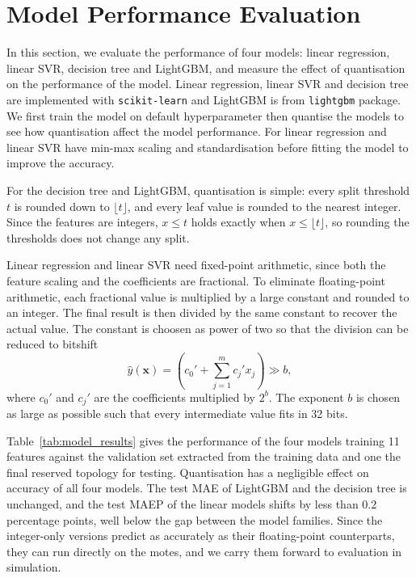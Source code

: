 \section{Model Performance Evaluation}
In this section, we evaluate the performance of four models: linear
regression, linear SVR, decision tree and
LightGBM, and measure the effect of quantisation on the performance of the
model. Linear regression, linear SVR and decision tree are
implemented with \texttt{scikit-learn} \cite{scikit-learn} and
LightGBM is from \texttt{lightgbm} package.
We first train the model on default hyperparameter then quantise the
models to see how quantisation affect the model performance. For
linear regression and linear SVR have min-max scaling and
standardisation before fitting the model to improve the accuracy.

For the decision tree and LightGBM, quantisation is simple: every
split threshold $t$ is rounded down to $\lfloor t \rfloor$, and every
leaf value is rounded to the nearest integer. Since the features are
integers, $x \le t$ holds exactly when $x \le \lfloor t \rfloor$, so
rounding the thresholds does not change any split.

Linear regression and linear SVR need fixed-point arithmetic, since
both the feature scaling and the coefficients are fractional.
To eliminate floating-point arithmetic, each fractional value is
multiplied by a large constant and rounded to an integer. The final
result is then divided by the same constant to recover the actual
value. The constant is choosen as power of two so that the division can be
reduced to bitshift
\begin{equation}
    \hat{y}(\mathbf{x}) =
    \left( c_0' + \sum_{j=1}^{m} c_j' x_j \right) \gg b,
\end{equation}
where $c_0'$ and $c_j'$ are the coefficients multiplied by $2^b$. The
exponent $b$ is chosen as large as possible such that every
intermediate value fits in 32 bits.

Table~\ref{tab:model_results} gives the performance of the
four models training 11 features against the validation set extracted
from the training data and one the final reserved topology for
testing. Quantisation has a negligible effect on accuracy of all four
models. The test MAE of LightGBM and the decision tree is unchanged,
and the test MAEP of the linear models shifts by less than 0.2
percentage points, well below
the gap between the model families. Since the integer-only versions
predict as accurately as their floating-point counterparts, they can
run directly on the motes, and we carry them forward to evaluation in
simulation.

